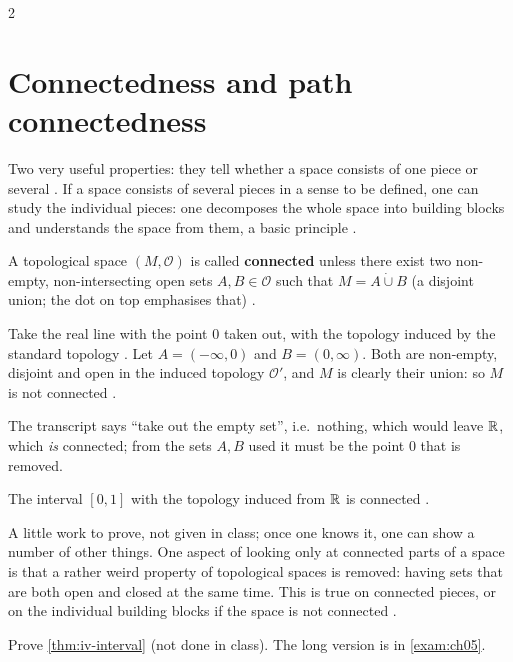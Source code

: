 \begin{paracol}{2}
\section{Connectedness and path connectedness}\label{sec:iv-connected}

Two very useful properties: they tell whether a space consists of one piece or several . If a space consists of several pieces in a sense to be defined, one can study the individual pieces:
one decomposes the whole space into building blocks and understands the space from them, a basic principle .

\begin{definition}\label{def:iv-connected}
A topological space $(M,\mathcal O)$ is called \textbf{connected} unless there exist two non-empty, non-intersecting open sets $A,B\in\mathcal O$ such that $M=A\mathbin{\dot\cup}B$
(a disjoint union; the dot on top emphasises that) .
\end{definition}

\begin{example}\label{ex:iv-not-conn}
Take the real line with the point $0$ taken out, with the topology induced by the standard topology . Let $A=(-\infty,0)$ and $B=(0,\infty)$. Both are non-empty, disjoint and open in the induced
topology $\mathcal O'$, and $M$ is clearly their union: so $M$ is not connected .
\end{example}
\begin{coursenote}
The transcript says ``take out the empty set'', i.e.\ nothing, which would leave $\mathbb{R}$, which \emph{is} connected; from the sets $A,B$ used it must be the point $0$ that is removed.
\end{coursenote}
\begin{theorem}\label{thm:iv-interval}
The interval $[0,1]$ with the topology induced from $\mathbb{R}$ is connected .
\end{theorem}
A little work to prove, not given in class; once one knows it, one can show a number of other things. One aspect of looking only at connected parts of a space is that a rather weird property of topological spaces
is removed: having sets that are both open and closed at the same time. This is true on connected pieces, or on the individual building blocks if the space is not connected .
\begin{exercise}[{$[0,1]$} is connected]\label{ex:iv-interval-conn}
Prove \cref{thm:iv-interval} (not done in class). The long version is in \cref{exam:ch05}.
\end{exercise}


\end{paracol}

